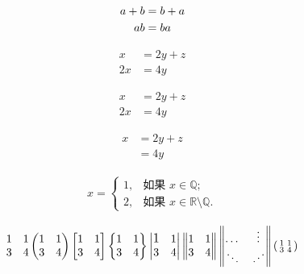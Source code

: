 \documentclass[12pt]{article} %
\newcommand{\adots}{\mathinner{\mkern2mu\raisebox{0.1em}{.}%
		\mkern2mu\raisebox{0.4em}{.}%
		\mkern2mu\raisebox{0.7em}{.}%
		\mkern1mu}}
\begin{document}
	\begin{gather}
		a+b=b+a \notag \\	%
		ab=ba
	\end{gather}
	
	\begin{align}	%
		x &= 2y+z	\\
		2x &= 4y
	\end{align}
	
	\begin{align*}
		x &= 2y+z	\\
		2x &= 4y
	\end{align*}
	
	\begin{equation}
		\begin{split}	%
			x &= 2y+z	\\
			&= 4y
		\end{split}
	\end{equation}
	
	\begin{equation}
	\begin{split}	%
	x =\begin{cases}
	1, & \text{如果 } x \in \mathbb{Q}; \\
	2, & \text{如果 } x \in \mathbb{R}\setminus\mathbb{Q}.
	\end{cases}
	\end{split}
	\end{equation}
	
	\[
		\begin{matrix}
		1 & 1 \\
		3 & 4
		\end{matrix}
		\begin{pmatrix}
		1 & 1 \\
		3 & 4
		\end{pmatrix}
		\begin{bmatrix}
		1 & 1 \\
		3 & 4
		\end{bmatrix}
		\begin{Bmatrix}
		1 & 1 \\
		3 & 4
		\end{Bmatrix}
		\begin{vmatrix}
		\text{\large 1} & 1 \\	%
		3 & 4
		\end{vmatrix}
		\begin{Vmatrix}
		1 & 1 \\
		3 & 4
		\end{Vmatrix}
		\begin{Vmatrix}
		\dots & \vdots \\
		\ddots & \adots	%
		\end{Vmatrix}
		\left(%
		\begin{smallmatrix}	%
		1 & 1 \\
		3 & 4
		\end{smallmatrix}
		\right)%
	\]
	
\end{document}
